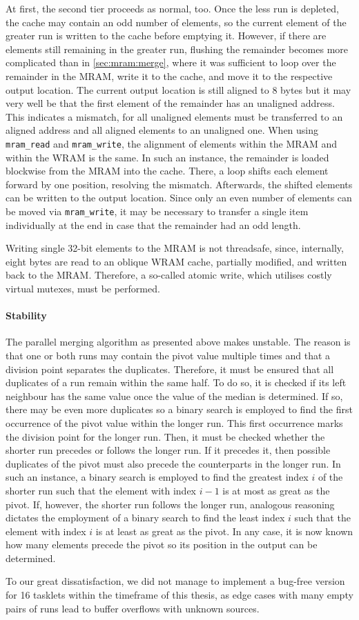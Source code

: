 At first, the second tier proceeds as normal, too.
Once the less run is depleted, the cache may contain an odd number of elements, so the current element of the greater run is written to the cache before emptying it.
However, if there are elements still remaining in the greater run, flushing the remainder becomes more complicated than in \cref{sec:mram:merge}, where it was sufficient to loop over the remainder in the \ac{MRAM}, write it to the cache, and move it to the respective output location.
The current output location is still aligned to 8 bytes but it may very well be that the first element of the remainder has an unaligned address.
This indicates a mismatch, for all unaligned elements must be transferred to an aligned address and all aligned elements to an unaligned one.
When using \lstinline|mram_read| and \lstinline|mram_write|, the alignment of elements within the \ac{MRAM} and within the \ac{WRAM} is the same.
In such an instance, the remainder is loaded blockwise from the \ac{MRAM} into the cache.
There, a loop shifts each element forward by one position, resolving the mismatch.
Afterwards, the shifted elements can be written to the output location.
Since only an even number of elements can be moved via \lstinline|mram_write|, it may be necessary to transfer a single item individually at the end in case that the remainder had an odd length.

Writing single 32-bit elements to the \ac{MRAM} is not threadsafe, since, internally, eight bytes are read to an oblique \ac{WRAM} cache, partially modified, and written back to the \ac{MRAM}.
Therefore, a so-called atomic write, which utilises costly virtual mutexes, must be performed.


\paragraph{Stability}
The parallel merging algorithm as presented above makes \MS{} unstable.
The reason is that one or both runs may contain the pivot value multiple times and that a division point separates the duplicates.
Therefore, it must be ensured that all duplicates of a run remain within the same half.
To do so, it is checked if its left neighbour has the same value once the value of the median is determined.
If so, there may be even more duplicates so a binary search is employed to find the first occurrence of the pivot value within the longer run.
This first occurrence marks the division point for the longer run.
Then, it must be checked whether the shorter run precedes or follows the longer run.
If it precedes it, then possible duplicates of the pivot must also precede the counterparts in the longer run.
In such an instance, a binary search is employed to find the greatest index \(i\) of the shorter run such that the element with index \(i - 1\) is at most as great as the pivot.
If, however, the shorter run follows the longer run, analogous reasoning dictates the employment of a binary search to find the least index \(i\) such that the element with index \(i\) is at least as great as the pivot.
In any case, it is now known how many elements precede the pivot so its position in the output can be determined.

To our great dissatisfaction, we did not manage to implement a bug-free version for 16 tasklets within the timeframe of this thesis, as edge cases with many empty pairs of runs lead to buffer overflows with unknown sources.
